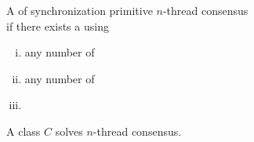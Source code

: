 % 
% 

\begin{frame}{}
  \begin{definition}[``Solves''] 
    A  of synchronization primitive  $n$-thread consensus \\
    if there exists a  using 

    \begin{enumerate}[(i)]
      \item any number of 
      \item any number of 
	\pause
      \item {}
    \end{enumerate}
  \end{definition}
\end{frame}

\begin{frame}{}

  \centerline{\Large A class $C$ solves $n$-thread consensus.}
\end{frame}
